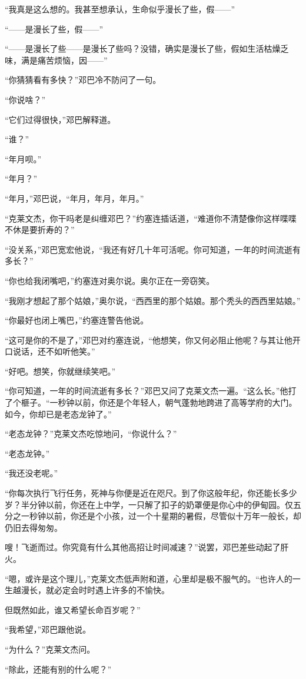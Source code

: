     “我真是这么想的。我甚至想承认，生命似乎漫长了些，假——”

    “——是漫长了些，假——”

    “——是漫长了些——是漫长了些吗？没错，确实是漫长了些，假如生活枯燥乏味，满是痛苦烦恼，因——”

    “你猜猜看有多快？”邓巴冷不防问了一句。

    “你说啥？”

    “它们过得很快，”邓巴解释道。

    “谁？”

    “年月呗。”

    “年月？”

    “年月，”邓巴说，“年月，年月，年月。”

    “克莱文杰，你干吗老是纠缠邓巴？”约塞连插话道，“难道你不清楚像你这样喋喋不休是要折寿的？”

    “没关系，”邓巴宽宏他说，“我还有好几十年可活呢。你可知道，一年的时间流逝有多长？”

    “你也给我闭嘴吧，”约塞连对奥尔说。奥尔正在一旁窃笑。

    “我刚才想起了那个姑娘，”奥尔说，“西西里的那个姑娘。那个秃头的西西里姑娘。”

    “你最好也闭上嘴巴，”约塞连警告他说。

    “这可是你的不是了，”邓巴对约塞连说，“他想笑，你又何必阻止他呢？与其让他开口说话，还不如听他笑。”

    “好吧。想笑，你就继续笑吧。”

    “你可知道，一年的时间流逝有多长？”邓巴又问了克莱文杰一遍。“这么长。”他打了个榧子。“一秒钟以前，你还是个年轻人，朝气蓬勃地跨进了高等学府的大门。如今，你却已是老态龙钟了。”

    “老态龙钟？”克莱文杰吃惊地问，“你说什么？”

    “老态龙钟。”

    “我还没老呢。”

    “你每次执行飞行任务，死神与你便是近在咫尺。到了你这般年纪，你还能长多少岁？半分钟以前，你还在上中学，一只解了扣子的奶罩便是你心中的伊甸园。仅五分之一秒钟以前，你还是个小孩，过一个十星期的暑假，尽管似十万年一般长，却仍旧去得匆匆。

    嗖！飞逝而过。你究竟有什么其他高招让时间减速？”说罢，邓巴差些动起了肝火。

    “嗯，或许是这个理儿，”克莱文杰低声附和道，心里却是极不服气的。“也许人的一生越漫长，就必定会时时遇上许多的不愉快。

    但既然如此，谁又希望长命百岁呢？”

    “我希望，”邓巴跟他说。

    “为什么？”克莱文杰问。

    “除此，还能有别的什么呢？”
